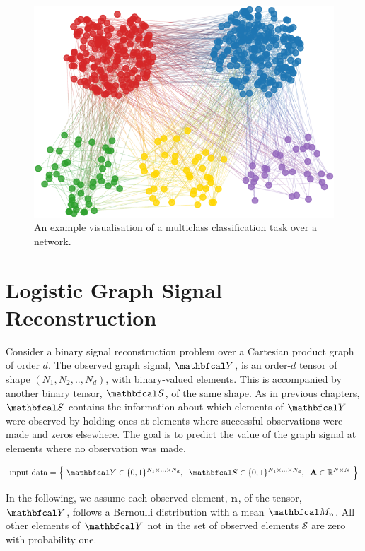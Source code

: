 \begin{figure}[t] 
    \begin{center}
        \includegraphics[width=0.8\linewidth]{Figures/multiclass_graph.pdf}
    \end{center}
   \caption[Visualisation of a multiclass classification task over a network]{An example visualisation of a multiclass classification task over a network.} 
    \label{fig:mutliclass_graph}
\end{figure} 



\section{Logistic Graph Signal Reconstruction}

\label{sec:lgsr}



Consider a binary signal reconstruction problem over a Cartesian product graph of order $d$. The observed graph signal, $\Yt$, is an order-$d$ tensor of shape $(N_1, N_2, .., N_d)$, with binary-valued elements. This is accompanied by another binary tensor, $\St$, of the same shape. As in previous chapters, $\St$ contains the information about which elements of $\Yt$ were observed by holding ones at elements where successful observations were made and zeros elsewhere. The goal is to predict the value of the graph signal at elements where no observation was made. 

\begin{equation*}
    \text{input data} = \Big\{\; \Yt \in \{0, 1\}^{N_1 \times ... \times N_d}, \;\; \St \in \{0, 1\}^{N_1 \times ... \times N_d} , \;\; \A \in \R^{N \times N} \; \Big\}
\end{equation*}

In the following, we assume each observed element, $\mathbf{n}$, of the tensor, $\Yt$, follows a Bernoulli distribution with a mean $\Mt_\nn$. All other elements of $\Yt$ not in the set of observed elements $\mathcal{S}$ are zero with probability one. 

